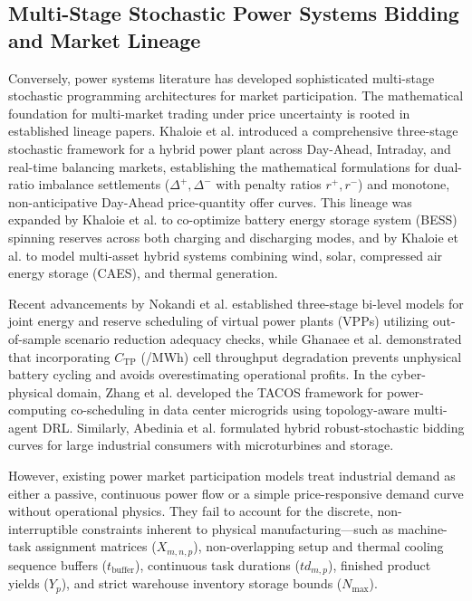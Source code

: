 \documentclass[journal]{IEEEtran}
\begin{document}
\subsection{Multi-Stage Stochastic Power Systems Bidding and Market Lineage}
Conversely, power systems literature has developed sophisticated multi-stage stochastic programming architectures for market participation. The mathematical foundation for multi-market trading under price uncertainty is rooted in established lineage papers. Khaloie et al. \cite{khaloie2021tste} introduced a comprehensive three-stage stochastic framework for a hybrid power plant across Day-Ahead, Intraday, and real-time balancing markets, establishing the mathematical formulations for dual-ratio imbalance settlements ($\Delta^+, \Delta^-$ with penalty ratios $r^+, r^-$) and monotone, non-anticipative Day-Ahead price-quantity offer curves. This lineage was expanded by Khaloie et al. \cite{khaloie2020apen} to co-optimize battery energy storage system (BESS) spinning reserves across both charging and discharging modes, and by Khaloie et al. \cite{khaloie2021jcp} to model multi-asset hybrid systems combining wind, solar, compressed air energy storage (CAES), and thermal generation.

Recent advancements by Nokandi et al. \cite{nokandi2024} established three-stage bi-level models for joint energy and reserve scheduling of virtual power plants (VPPs) utilizing out-of-sample scenario reduction adequacy checks, while Ghanaee et al. \cite{ghanaee2024} demonstrated that incorporating $C_{\text{TP}}$ (\texteuro/MWh) cell throughput degradation prevents unphysical battery cycling and avoids overestimating operational profits. In the cyber-physical domain, Zhang et al. \cite{zhang2026tacos} developed the TACOS framework for power-computing co-scheduling in data center microgrids using topology-aware multi-agent DRL. Similarly, Abedinia et al. \cite{abedinia2019} formulated hybrid robust-stochastic bidding curves for large industrial consumers with microturbines and storage. 

However, existing power market participation models treat industrial demand as either a passive, continuous power flow or a simple price-responsive demand curve without operational physics. They fail to account for the discrete, non-interruptible constraints inherent to physical manufacturing—such as machine-task assignment matrices ($X_{m,n,p}$), non-overlapping setup and thermal cooling sequence buffers ($t_{\text{buffer}}$), continuous task durations ($td_{m,p}$), finished product yields ($Y_p$), and strict warehouse inventory storage bounds ($N_{\text{max}}$).
\end{document}
